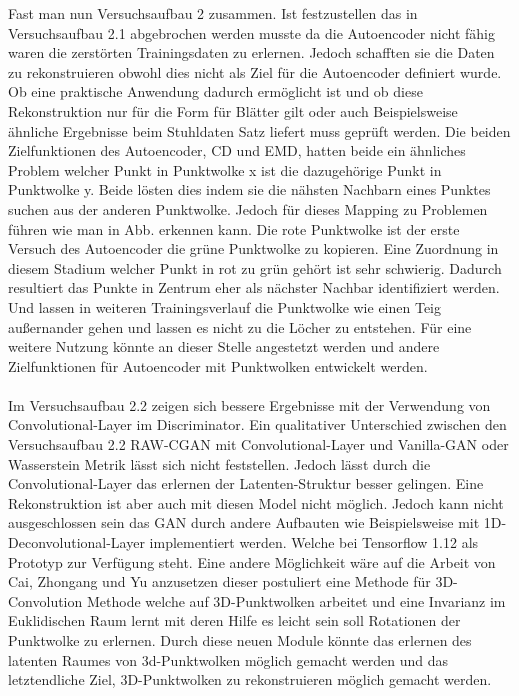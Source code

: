 \documentclass{llncs}
\begin{document}
Fast man nun Versuchsaufbau 2 zusammen. Ist festzustellen das in Versuchsaufbau 2.1 abgebrochen werden musste da die Autoencoder nicht fähig waren die zerstörten Trainingsdaten zu erlernen. Jedoch schafften sie die Daten zu rekonstruieren obwohl dies nicht als Ziel für die Autoencoder definiert wurde. Ob eine praktische Anwendung dadurch ermöglicht ist und ob diese Rekonstruktion nur für die Form für Blätter gilt oder auch Beispielsweise ähnliche Ergebnisse beim Stuhldaten Satz liefert muss geprüft werden. Die beiden Zielfunktionen des Autoencoder, CD und EMD, hatten beide ein ähnliches Problem welcher Punkt in Punktwolke x ist die dazugehörige Punkt in Punktwolke y. Beide lösten dies indem sie die nähsten Nachbarn eines Punktes suchen aus der anderen Punktwolke.  Jedoch für dieses Mapping zu Problemen führen wie man in Abb. erkennen kann. Die rote Punktwolke ist der erste Versuch des Autoencoder die grüne Punktwolke zu kopieren. Eine Zuordnung in diesem Stadium welcher Punkt in rot zu grün gehört ist sehr schwierig. Dadurch resultiert das Punkte in Zentrum eher als nächster Nachbar identifiziert werden. Und lassen in weiteren Trainingsverlauf die Punktwolke wie einen Teig außernander gehen und lassen es nicht zu die Löcher zu entstehen. Für eine weitere Nutzung könnte an dieser Stelle angestetzt werden und andere Zielfunktionen für Autoencoder mit Punktwolken entwickelt werden. 
\\\\
Im Versuchsaufbau 2.2 zeigen sich bessere Ergebnisse mit der Verwendung von Convolutional-Layer im Discriminator. Ein qualitativer Unterschied zwischen den Versuchsaufbau 2.2 RAW-CGAN mit Convolutional-Layer und Vanilla-GAN oder Wasserstein Metrik lässt sich nicht feststellen. Jedoch lässt durch die Convolutional-Layer das erlernen der Latenten-Struktur besser gelingen. Eine Rekonstruktion ist aber auch mit diesen Model nicht möglich. Jedoch kann nicht ausgeschlossen sein das GAN durch andere Aufbauten wie Beispielsweise mit 1D-Deconvolutional-Layer implementiert werden. Welche bei Tensorflow 1.12 als Prototyp zur Verfügung steht. Eine andere Möglichkeit wäre auf die Arbeit von Cai, Zhongang  und Yu \cite{3d-conv} anzusetzen dieser postuliert eine Methode für 3D-Convolution Methode welche auf 3D-Punktwolken arbeitet und eine Invarianz im Euklidischen Raum lernt mit deren Hilfe es leicht sein soll Rotationen der Punktwolke zu erlernen. Durch diese neuen Module könnte das erlernen des latenten Raumes von 3d-Punktwolken möglich gemacht werden und das letztendliche Ziel, 3D-Punktwolken zu rekonstruieren möglich gemacht werden. 

\newpage
\listoffigures
\newpage


\end{document}
